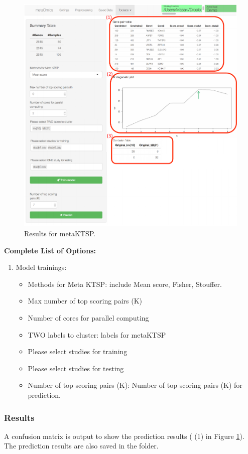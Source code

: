 \begin{steps}
\begin{figure}[H]
\begin{center}
\includegraphics[scale=0.7]{./figure/MetaKTSP/MetaKTSPresult.pdf}
\caption{Results for metaKTSP.}
\label{fig:MetaKTSPresult}
\end{center}
\end{figure}

\end{steps}

\textbf{Complete List of Options:} 
\begin{enumerate}
\item Model trainings: 
\begin{itemize}
\item Methods for Meta KTSP: include Mean score, Fisher, Stouffer.
\item Max number of top scoring pairs (K)
\item Number of cores for parallel computing
\item TWO labels to cluster: labels for metaKTSP
\item Please select studies for training
\item Please select studies for testing
\item Number of top scoring pairs (K): Number of top scoring pairs (K) for prediction.
\end{itemize}

\end{enumerate}

\subsubsection{Results}

A confusion matrix is output to show the prediction results ({\color{red} (1)} in Figure \ref{fig:MetaKTSPresult}).
The prediction results are also saved in the folder.

